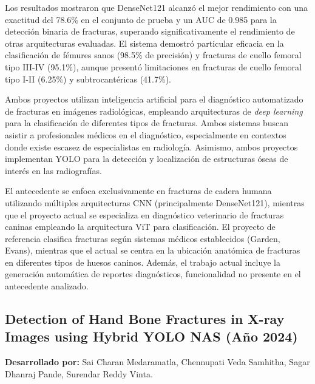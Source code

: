 {Los resultados mostraron que DenseNet121 alcanzó el mejor rendimiento con una exactitud del 78.6\% en el conjunto de prueba y un AUC de 0.985 para la detección binaria de fracturas, superando significativamente el rendimiento de otras arquitecturas evaluadas. El sistema demostró particular eficacia en la clasificación de fémures sanos (98.5\% de precisión) y fracturas de cuello femoral tipo III-IV (95.1\%), aunque presentó limitaciones en fracturas de cuello femoral tipo I-II (6.25\%) y subtrocantéricas (41.7\%).

Ambos proyectos utilizan inteligencia artificial para el diagnóstico automatizado de fracturas en imágenes radiológicas, empleando arquitecturas de \textit{deep learning} para la clasificación de diferentes tipos de fracturas. Ambos sistemas buscan asistir a profesionales médicos en el diagnóstico, especialmente en contextos donde existe escasez de especialistas en radiología. Asimismo, ambos proyectos implementan YOLO para la detección y localización de estructuras óseas de interés en las radiografías.

El antecedente se enfoca exclusivamente en fracturas de cadera humana utilizando múltiples arquitecturas CNN (principalmente DenseNet121), mientras que el proyecto actual se especializa en diagnóstico veterinario de fracturas caninas empleando la arquitectura ViT para clasificación. El proyecto de referencia clasifica fracturas según sistemas médicos establecidos (Garden, Evans), mientras que el actual se centra en la ubicación anatómica de fracturas en diferentes tipos de huesos caninos. Además, el trabajo actual incluye la generación automática de reportes diagnósticos, funcionalidad no presente en el antecedente analizado.

\subsection{Detection of Hand Bone Fractures in X-ray Images using Hybrid YOLO NAS (Año 2024)}

\textbf{Desarrollado por:} Sai Charan Medaramatla, Chennupati Veda Samhitha, Sagar Dhanraj Pande, Surendar Reddy Vinta.

}
